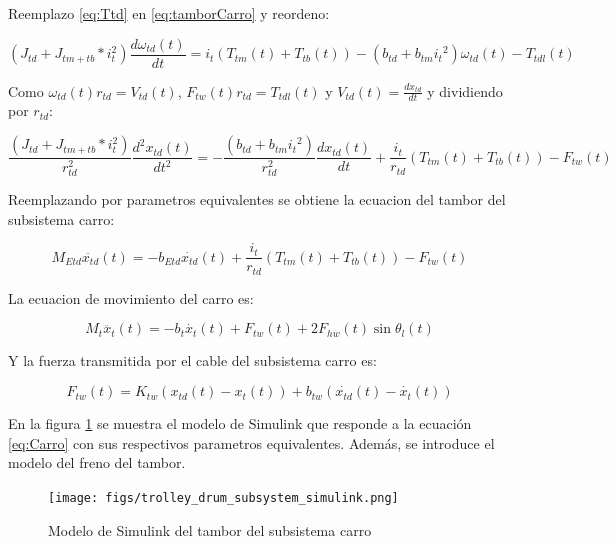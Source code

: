 \documentclass{article}
\begin{document}
            Reemplazo \ref{eq:Ttd} en \ref{eq:tamborCarro} y reordeno:

            \begin{equation} \label{eq:carroTtdl}
                (J_{td} + J_{tm+tb}*i_t^2) \frac{d \omega_{td}(t)}{dt} = i_t (T_{tm}(t) + T_{tb}(t)) - (b_{td} + b_{tm}{i_t}^2) \omega_{td}(t) - T_{tdl}(t)
            \end{equation}
        
            Como $\omega_{td}(t) r_{td} = V_{td}(t)$, $F_{tw}(t)r_{td} = T_{tdl}(t)$ y $V_{td}(t) = \frac{d x_{td}}{dt}$ y dividiendo por $r_{td}$:
            
            \begin{equation} \label{eq:carroFtw}
                \frac{(J_{td} + J_{tm+tb}*i_t^2)}{r_{td}^2} \frac{d^2 x_{td}(t)}{dt^2} = - \frac{(b_{td} + b_{tm}{i_t}^2)}{r_{td}^2} \frac{d x_{td}(t)}{dt} + \frac{i_t}{r_{td}} (T_{tm}(t) + T_{tb}(t)) - F_{tw}(t)
            \end{equation}

            Reemplazando por parametros equivalentes se obtiene la ecuacion del tambor del subsistema carro:

            \begin{equation} \label{eq:TamborCarro}
                M_{Etd} \ddot{x_{td}}(t) = - b_{Etd} \dot{x_{td}}(t) + \frac{i_t}{r_{td}} (T_{tm}(t) + T_{tb}(t)) - F_{tw}(t)
            \end{equation}

            La ecuacion de movimiento del carro es:

            \begin{equation} \label{eq:Carro}
                M_t \ddot{x_{t}}(t) = - b_t \dot{x_{t}}(t) + F_{tw}(t) + 2F_{hw}(t)\sin{\theta_l(t)}
            \end{equation}

            Y la fuerza transmitida por el cable del subsistema carro es:

            \begin{equation} \label{eq:fuerzaCableCarro}
                F_{tw}(t) = K_{tw}(x_{td}(t) - x_t(t)) + b_{tw}(\dot{x_{td}}(t) - \dot{x_t}(t))
            \end{equation}

            En la figura \ref{fig:trolley_drum_mode_simulink} se muestra el modelo de Simulink que responde a la ecuación \ref{eq:Carro} con sus respectivos parametros equivalentes. Además, se introduce el modelo del freno del tambor.
            \begin{figure} [H]
                \centering
                \texttt{[image: figs/trolley\_drum\_subsystem\_simulink.png]}
                \caption{Modelo de Simulink del tambor del subsistema carro}
                \label{fig:trolley_drum_mode_simulink}
            \end{figure}
\end{document}
